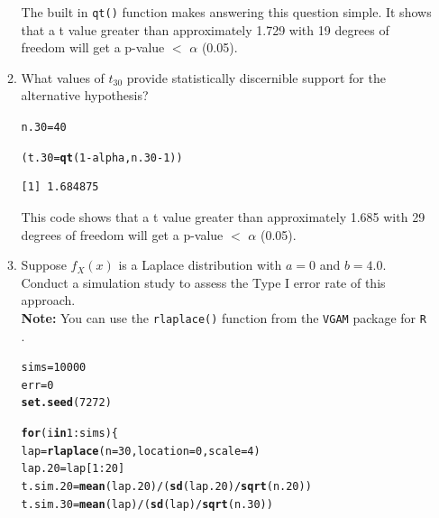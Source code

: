\documentclass{article}\usepackage[]{graphicx}\usepackage[]{xcolor}
\makeatletter
\newcommand{\hlnum}[1]{\textcolor[rgb]{0.686,0.059,0.569}{#1}}%
\newcommand{\hlopt}[1]{\textcolor[rgb]{0,0,0}{#1}}%
\newcommand{\hldef}[1]{\textcolor[rgb]{0.345,0.345,0.345}{#1}}%
\newcommand{\hlkwa}[1]{\textcolor[rgb]{0.161,0.373,0.58}{\textbf{#1}}}%
\newcommand{\hlkwb}[1]{\textcolor[rgb]{0.69,0.353,0.396}{#1}}%
\newcommand{\hlkwc}[1]{\textcolor[rgb]{0.333,0.667,0.333}{#1}}%
\newcommand{\hlkwd}[1]{\textcolor[rgb]{0.737,0.353,0.396}{\textbf{#1}}}%
\newenvironment{kframe}{%
 \def\at@end@of@kframe{}%
 \ifinner\ifhmode%
  \def\at@end@of@kframe{\end{minipage}}%
  \begin{minipage}{\columnwidth}%
 \fi\fi%
 \def\FrameCommand##1{\hskip\@totalleftmargin \hskip-\fboxsep
 \colorbox{shadecolor}{##1}\hskip-\fboxsep
     \hskip-\linewidth \hskip-\@totalleftmargin \hskip\columnwidth}%
 \MakeFramed {\advance\hsize-\width
   \@totalleftmargin\z@ \linewidth\hsize
   \@setminipage}}%
 {\par\unskip\endMakeFramed%
 \at@end@of@kframe}
\newenvironment{knitrout}{}{} %
\makeatother
\begin{document}
\begin{enumerate}
\begin{enumerate}
The built in \texttt{qt()} function makes answering this question simple. It shows that a t value greater than approximately 1.729 with 19 degrees of freedom will get a p-value $<$ $\alpha$ (0.05). \\
  
  \item What values of $t_{30}$ provide statistically discernible support for the
  alternative hypothesis?
  
\begin{knitrout}
\color{fgcolor}\begin{kframe}
\begin{alltt}
\hldef{n.30} \hlkwb{=} \hlnum{40}

\hldef{(t.30} \hlkwb{=} \hlkwd{qt}\hldef{(}\hlnum{1} \hlopt{-} \hldef{alpha, n.30}\hlopt{-}\hlnum{1}\hldef{))}
\end{alltt}
\begin{verbatim}
[1] 1.684875
\end{verbatim}
\end{kframe}
\end{knitrout}
This code shows that a t value greater than approximately 1.685 with 29 degrees of freedom will get a p-value $<$ $\alpha$ (0.05). \\

  \item Suppose $f_X(x)$ is a Laplace distribution with $a=0$ and $b=4.0$.
  Conduct a simulation study to assess the Type I error rate of this approach.\\
  \textbf{Note:} You can use the \texttt{rlaplace()} function from the \texttt{VGAM}
  package for \texttt{R} \citep{VGAM}.
  


  
\begin{knitrout}
\color{fgcolor}\begin{kframe}
\begin{alltt}
\hldef{sims} \hlkwb{=} \hlnum{10000}
\hldef{err} \hlkwb{=} \hlnum{0}
\hlkwd{set.seed}\hldef{(}\hlnum{7272}\hldef{)}

\hlkwa{for} \hldef{(i} \hlkwa{in} \hlnum{1}\hlopt{:}\hldef{sims)\{}
  \hldef{lap} \hlkwb{=} \hlkwd{rlaplace}\hldef{(}\hlkwc{n} \hldef{=} \hlnum{30}\hldef{,} \hlkwc{location} \hldef{=} \hlnum{0}\hldef{,} \hlkwc{scale} \hldef{=} \hlnum{4}\hldef{)}
  \hldef{lap.20} \hlkwb{=} \hldef{lap[}\hlnum{1}\hlopt{:}\hlnum{20}\hldef{]}
  \hldef{t.sim.20} \hlkwb{=} \hlkwd{mean}\hldef{(lap.20)}\hlopt{/}\hldef{(}\hlkwd{sd}\hldef{(lap.20)}\hlopt{/}\hlkwd{sqrt}\hldef{(n.20))}
  \hldef{t.sim.30} \hlkwb{=} \hlkwd{mean}\hldef{(lap)}\hlopt{/}\hldef{(}\hlkwd{sd}\hldef{(lap)}\hlopt{/}\hlkwd{sqrt}\hldef{(n.30))}


\end{alltt}
\end{kframe}
\end{knitrout}
\end{enumerate}
\end{enumerate}
\end{document}
